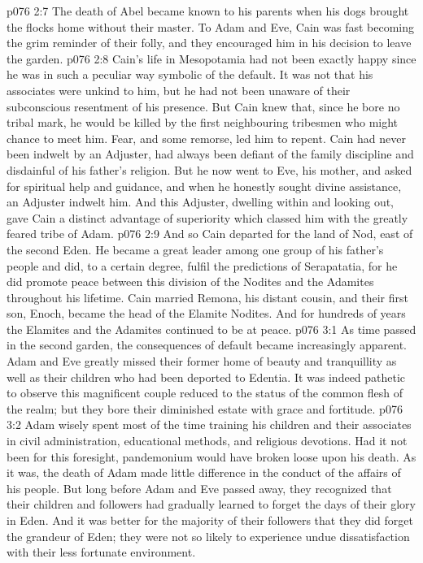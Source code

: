 \vs p076 2:7 \pc The death of Abel became known to his parents when his dogs brought the flocks home without their master. To Adam and Eve, Cain was fast becoming the grim reminder of their folly, and they encouraged him in his decision to leave the garden.
\vs p076 2:8 Cain’s life in Mesopotamia had not been exactly happy since he was in such a peculiar way symbolic of the default. It was not that his associates were unkind to him, but he had not been unaware of their subconscious resentment of his presence. But Cain knew that, since he bore no tribal mark, he would be killed by the first neighbouring tribesmen who might chance to meet him. Fear, and some remorse, led him to repent. Cain had never been indwelt by an Adjuster, had always been defiant of the family discipline and disdainful of his father’s religion. But he now went to Eve, his mother, and asked for spiritual help and guidance, and when he honestly sought divine assistance, an Adjuster indwelt him. And this Adjuster, dwelling within and looking out, gave Cain a distinct advantage of superiority which classed him with the greatly feared tribe of Adam.
\vs p076 2:9 And so Cain departed for the land of Nod, east of the second Eden. He became a great leader among one group of his father’s people and did, to a certain degree, fulfil the predictions of Serapatatia, for he did promote peace between this division of the Nodites and the Adamites throughout his lifetime. Cain married Remona, his distant cousin, and their first son, Enoch, became the head of the Elamite Nodites. And for hundreds of years the Elamites and the Adamites continued to be at peace.
\vs p076 3:1 As time passed in the second garden, the consequences of default became increasingly apparent. Adam and Eve greatly missed their former home of beauty and tranquillity as well as their children who had been deported to Edentia. It was indeed pathetic to observe this magnificent couple reduced to the status of the common flesh of the realm; but they bore their diminished estate with grace and fortitude.
\vs p076 3:2 Adam wisely spent most of the time training his children and their associates in civil administration, educational methods, and religious devotions. Had it not been for this foresight, pandemonium would have broken loose upon his death. As it was, the death of Adam made little difference in the conduct of the affairs of his people. But long before Adam and Eve passed away, they recognized that their children and followers had gradually learned to forget the days of their glory in Eden. And it was better for the majority of their followers that they did forget the grandeur of Eden; they were not so likely to experience undue dissatisfaction with their less fortunate environment.
